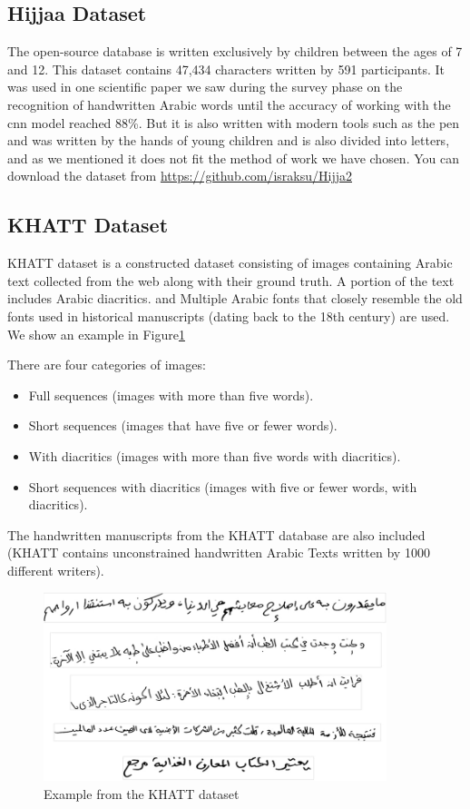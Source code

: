 \subsection{Hijjaa Dataset}
The open-source database is written exclusively by children between the ages of 7 and 12. This dataset contains 47,434 characters written by 591 participants. It was used in one scientific paper we saw during the survey phase on the recognition of handwritten Arabic words until the accuracy of working with the \acrshort{cnn} model reached 88\%.\cite{altwaijry2021arabic} But it is also written with modern tools such as the pen and was written by the hands of young children and is also divided into letters, and as we mentioned it does not fit the method of work we have chosen. You can download the dataset from \url{https://github.com/israksu/Hijja2}

\subsection{KHATT Dataset}
KHATT dataset \cite{KHATT} is a constructed dataset consisting of images containing Arabic text collected from the web along with their ground truth.
A portion of the text includes Arabic diacritics. and Multiple Arabic fonts that closely resemble the old fonts used in historical manuscripts (dating back to the 18th century) are used. We show an example in Figure\ref{fig:Sample-text-images-from-the-KHATT-dataset}

There are four categories of images:

\begin{itemize}[itemsep=1pt, topsep=5pt]
    \item Full sequences (images with more than five words).
    \item Short sequences (images that have five or fewer words).
    \item With diacritics (images with more than five words with diacritics).
    \item Short sequences with diacritics (images with five or fewer words, with diacritics).
\end{itemize}  

\noindent
The handwritten manuscripts from the KHATT database are also included (KHATT contains unconstrained handwritten Arabic Texts written by 1000 different writers).\cite{mostafa2021ocformer}

\begin{figure}[!htb]
    \centering
    \includegraphics[width=10cm]{images/Sample-text-images-from-the-KHATT-database.PNG}
    \caption{Example from the KHATT dataset}
    \label{fig:Sample-text-images-from-the-KHATT-dataset}
\end{figure}


